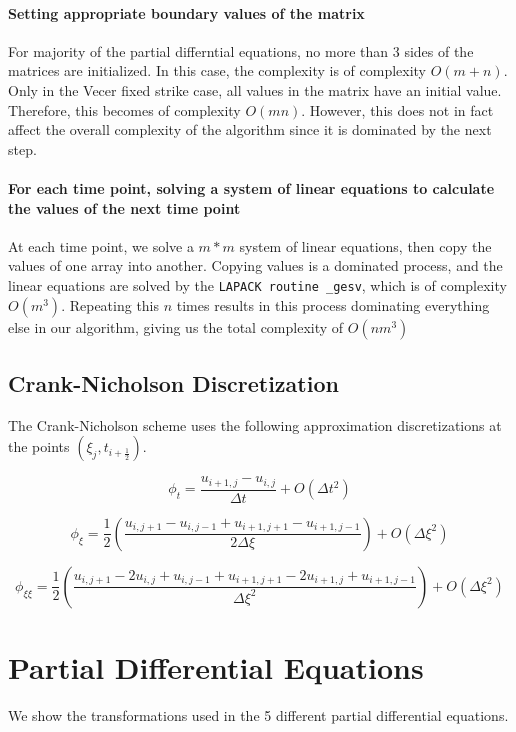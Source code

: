 \documentclass[12pt]{report}
\begin{document}
\subsubsection{Setting appropriate boundary values of the matrix}
For majority of the partial differntial equations, no more than 3 sides of the matrices are initialized. In this case, the complexity is of complexity \(O(m+n)\). Only in the Vecer fixed strike case, all values in the matrix have an initial value. Therefore, this becomes of complexity \(O(mn)\). However, this does not in fact affect the overall complexity of the algorithm since it is dominated by the next step.
\subsubsection{For each time point, solving a system of linear equations to calculate the values of the next time point}
At each time point, we solve a \(m*m\) system of linear equations, then copy the values of one array into another. Copying values is a dominated process, and the linear equations are solved by the \texttt{LAPACK routine \_gesv}\cite{numpy_manual}, which is of complexity \(O(m^3)\). Repeating this \(n\) times results in this process dominating everything else in our algorithm, giving us the total complexity of \(O(nm^3)\)

\section{Crank-Nicholson Discretization}
The Crank-Nicholson scheme uses the following approximation discretizations at the points \((\xi_j, t_{i+\frac{1}{2}})\).

\begin{equation}
  \phi_t = \frac{u_{i+1, j} - u_{i, j}}{\Delta t} + O(\Delta t^2)
\end{equation}

\begin{equation}
  \phi_\xi = \frac{1}{2}(\frac{u_{i, j+1} - u_{i,j-1} +u_{i+1, j+1} - u_{i+1, j-1}}{2\Delta\xi}) + O(\Delta\xi^2)
\end{equation}

\begin{equation}
  \phi_{\xi\xi} = \frac{1}{2}(\frac{u_{i, j+1} - 2u_{i, j} + u_{i, j-1} + u_{i + 1, j+1} - 2 u_{i+1, j} + u_{i+1, j-1}}{\Delta\xi^2}) + O(\Delta\xi^2)
\end{equation}

\chapter{Partial Differential Equations}
We show the transformations used in the 5 different partial differential equations.
\end{document}
